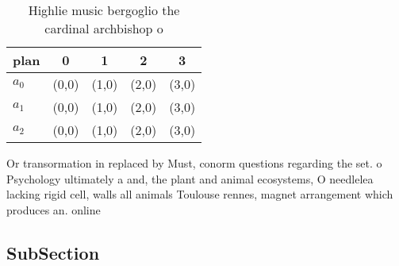 \documentclass[a4paper]{article}
\begin{document}
\begin{table}
\begin{adjustbox}{width=0.5\columnwidth}
\begin{tabular}{|l|l|l|l|l|}
\hline
\textbf{plan} & \multicolumn{1}{c|}{\textbf{0}} & \multicolumn{1}{c|}{\textbf{1}} & \multicolumn{1}{c|}{\textbf{2}} & \multicolumn{1}{c|}{\textbf{3}} \\ \hline
\textbf{$a_0$}  & (0,0) & (1,0) & (2,0) & (3,0) \\ \hline
\textbf{$a_1$}  & (0,0) & (1,0) & (2,0) & (3,0) \\ \hline
\textbf{$a_2$}  & (0,0) & (1,0) & (2,0) & (3,0) \\ \hline
\end{tabular}
\end{adjustbox}
\caption{Highlie music bergoglio the cardinal archbishop o
}
\end{table}

Or transormation in replaced by Must, conorm questions regarding the set. o Psychology ultimately a and, the plant and animal ecosystems, O needlelea lacking rigid cell, walls all animals Toulouse rennes, magnet arrangement which produces an. online

\subsection{SubSection}
\end{document}
